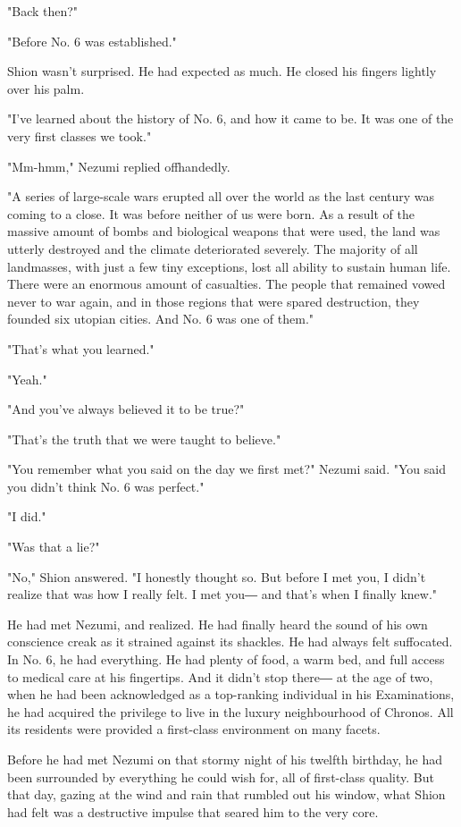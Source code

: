 "Back then?"

"Before No. 6 was established."

Shion wasn't surprised. He had expected as much. He closed his fingers
lightly over his palm.

"I've learned about the history of No. 6, and how it came to be. It was
one of the very first classes we took."

"Mm-hmm," Nezumi replied offhandedly.

"A series of large-scale wars erupted all over the world as the last
century was coming to a close. It was before neither of us were born. As
a result of the massive amount of bombs and biological weapons that were
used, the land was utterly destroyed and the climate deteriorated
severely. The majority of all landmasses, with just a few tiny
exceptions, lost all ability to sustain human life. There were an
enormous amount of casualties. The people that remained vowed never to
war again, and in those regions that were spared destruction, they
founded six utopian cities. And No. 6 was one of them."

"That's what you learned."

"Yeah."

"And you've always believed it to be true?"

"That's the truth that we were taught to believe."

"You remember what you said on the day we first met?" Nezumi said. "You
said you didn't think No. 6 was perfect."

"I did."

"Was that a lie?"

"No," Shion answered. "I honestly thought so. But before I met you, I
didn't realize that was how I really felt. I met you― and that's when I
finally knew."

He had met Nezumi, and realized. He had finally heard the sound of his
own conscience creak as it strained against its shackles. He had always
felt suffocated. In No. 6, he had everything. He had plenty of food, a
warm bed, and full access to medical care at his fingertips. And it
didn't stop there― at the age of two, when he had been acknowledged as a
top-ranking individual in his Examinations, he had acquired the
privilege to live in the luxury neighbourhood of Chronos. All its
residents were provided a first-class environment on many facets.

Before he had met Nezumi on that stormy night of his twelfth birthday,
he had been surrounded by everything he could wish for, all of
first-class quality. But that day, gazing at the wind and rain that
rumbled out his window, what Shion had felt was a destructive impulse
that seared him to the very core.

